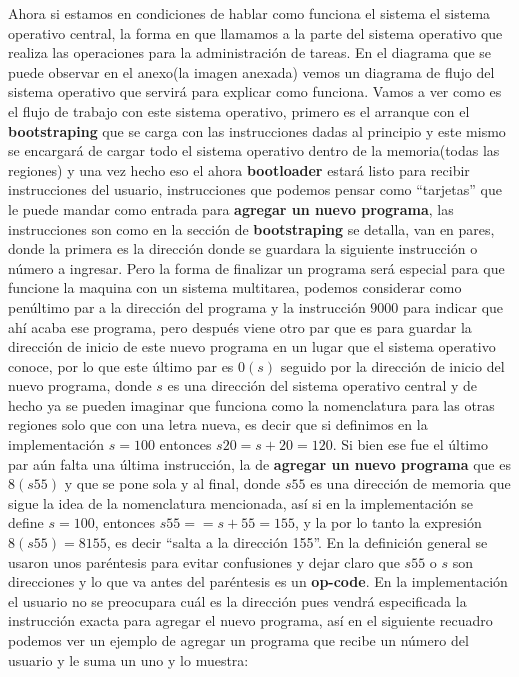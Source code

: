 \documentclass[12pt]{article}
\begin{document}
	Ahora si estamos en condiciones de hablar como funciona el sistema el sistema operativo central, la forma en que llamamos
	a la parte del sistema operativo que realiza las operaciones para la administración de tareas. En el diagrama que
	se puede observar en el anexo(la imagen anexada) vemos un diagrama de flujo del sistema operativo que servirá para explicar
	como funciona. Vamos a ver como es el flujo de trabajo con este sistema operativo, primero es el arranque con el 
	\textbf{bootstraping} que se carga con las instrucciones dadas al principio y este mismo se encargará de cargar todo el sistema
	operativo dentro de la memoria(todas las regiones) y una vez hecho eso el ahora \textbf{bootloader} estará listo
	para recibir instrucciones del usuario, instrucciones que podemos pensar como ``tarjetas'' que le puede mandar como
	entrada para \textbf{agregar un nuevo programa}, las instrucciones son como en la sección de \textbf{bootstraping}
	se detalla, van en pares, donde la primera es la dirección donde se guardara la siguiente instrucción o número a ingresar.
   Pero la forma de finalizar un programa será especial para que funcione la maquina con un sistema multitarea, podemos
   considerar como penúltimo par a la dirección del programa y la instrucción $9000$ para indicar que ahí acaba ese programa,
   pero después viene otro par que es para guardar la dirección de inicio de este nuevo programa en un lugar que el
   sistema operativo conoce, por lo que este último par es $0(s)$ seguido por la dirección de inicio del nuevo programa,
   donde $s$ es una dirección del sistema operativo central y de hecho ya se pueden imaginar que funciona
   como la nomenclatura para las otras regiones solo que con una letra nueva, es decir que si definimos en la implementación
   $s=100$ entonces $s20=s+20=120$. Si bien ese fue el último par aún falta una última instrucción, la de 
   \textbf{agregar un nuevo programa} que es $8(s55)$ y que se pone sola y al final, donde $s55$ es una dirección de memoria que
   sigue la idea de la nomenclatura mencionada, así
   si en la implementación se define $s=100$, entonces $s55==s+55=155$, y la por lo tanto la expresión $8(s55)=8155$, es decir
   ``salta a la dirección 155''. En la definición general se usaron unos paréntesis para evitar confusiones y dejar claro
   que $s55$ o $s$ son direcciones y lo que va antes del paréntesis es un \textbf{op-code}. En la implementación el usuario
   no se preocupara cuál es la dirección pues vendrá especificada la instrucción exacta para agregar el nuevo programa,
   así en el siguiente recuadro podemos ver un ejemplo de agregar un programa que recibe un número del usuario y le suma un uno
   y lo muestra:
   
\end{document}
